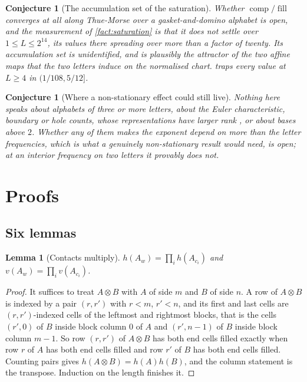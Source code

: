 \documentclass[11pt]{amsart}
\newtheorem{lemma}[theorem]{Lemma}
\newtheorem{conjecture}[theorem]{Conjecture}
\theoremstyle{definition}
\theoremstyle{remark}
\DeclareMathOperator{\comp}{comp}
\DeclareMathOperator{\fil}{fill}
\begin{document}
\begin{conjecture}[The accumulation set of the saturation]
\label{con:accum}
Whether $\comp/\fil$ converges at all along Thue-Morse over a gasket-and-domino alphabet is open, and the measurement of \cref{fact:saturation} is that it does not settle over $1 \le L \le 2^{14}$, its values there spreading over more than a factor of twenty. Its accumulation set is unidentified, and is plausibly the attractor of the two affine maps that the two letters induce on the normalised chart.  traps every value at $L \ge 4$ in $(1/108, 5/12]$.
\end{conjecture}

\begin{conjecture}[Where a non-stationary effect could still live]
\label{con:three}
Nothing here speaks about alphabets of three or more letters, about the Euler characteristic, boundary or hole counts, whose representations have larger rank \cite{ordersensitivity}, or about bases above $2$. Whether any of them makes the exponent depend on more than the letter frequencies, which is what a genuinely non-stationary result would need, is open; at an interior frequency on two letters it provably does not.
\end{conjecture}

\section{Proofs}
\label{sec:proofs}

\subsection{Six lemmas}

\begin{lemma}[Contacts multiply]
\label{lem:contact}
$h(A_w) = \prod_i h(A_{c_i})$ and $v(A_w) = \prod_i v(A_{c_i})$.
\end{lemma}

\begin{proof}
It suffices to treat $A \otimes B$ with $A$ of side $m$ and $B$ of side $n$. A row of $A \otimes B$ is indexed by a pair $(r, r')$ with $r < m$, $r' < n$, and its first and last cells are $(r,r')$-indexed cells of the leftmost and rightmost blocks, that is the cells $(r', 0)$ of $B$ inside block column $0$ of $A$ and $(r', n-1)$ of $B$ inside block column $m-1$. So row $(r,r')$ of $A \otimes B$ has both end cells filled exactly when row $r$ of $A$ has both end cells filled and row $r'$ of $B$ has both end cells filled. Counting pairs gives $h(A \otimes B) = h(A)h(B)$, and the column statement is the transpose. Induction on the length finishes it.
\end{proof}
\end{document}
